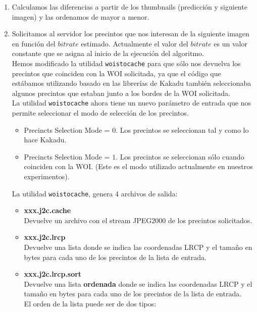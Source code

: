 \documentclass[11pt,a4paper]{article}
\begin{document}
\begin{enumerate}
  \item Calculamos las diferencias a partir de los thumbnails (predicci\'on y
  siguiente imagen) y las ordenamos de mayor a menor.

  \item Solicitamos al servidor los precintos que nos interesan de la siguiente
  imagen en funci\'on del $bitrate$ estimado. Actualmente el valor del $bitrate$
  es un valor constante que se asigna al inicio de la ejecuci\'{o}n del algoritmo. \\
  Hemos modificado la utilidad \texttt{woistocache}   para que s\'olo nos devuelva 
  los precintos que coinciden con la WOI solicitada, ya que el c\'odigo que 
  est\'abamos utilizando basado en las librer\'ias de Kakadu tambi\'en seleccionaba 
  algunos precintos   que estaban junto a los bordes de la WOI solicitada. \\   
  La utilidad \texttt{woistocache} ahora tiene un nuevo par\'ametro de entrada que 
  nos permite   seleccionar el modo de selecci\'on de los precintos.

    \begin{itemize}       
      \item Precincts Selection Mode = $0$. Los precintos se
      seleccionan tal y como lo hace Kakadu.       

      \item Precincts Selection Mode = $1$. Los precintos se 
      seleccionan s\'olo cuando coinciden con la WOI.
      (Este es el modo utilizado actualmente en nuestros experimentos).
    \end{itemize}

  La utilidad \texttt{woistocache}, genera 4 archivos de salida:
  
    \begin{itemize}
      \item \textbf{xxx.j2c.cache} \\
      Devuelve un archivo con el stream JPEG2000 de los precintos solicitados.

      \item \textbf{xxx.j2c.lrcp} \\ Devuelve una lista donde se indica las
      coordenadas LRCP y el tamaño en bytes para cada uno de los precintos de la lista
      de entrada.

      \item \textbf{xxx.j2c.lrcp.sort} \\ Devuelve una lista \textbf{ordenada} donde se indica las
      coordenadas LRCP y el tama\~no en bytes para cada uno de los precintos de la lista
      de entrada. \\
      El orden de la lista puede ser de dos tipos:


\end{itemize}
\end{enumerate}
\end{document}
